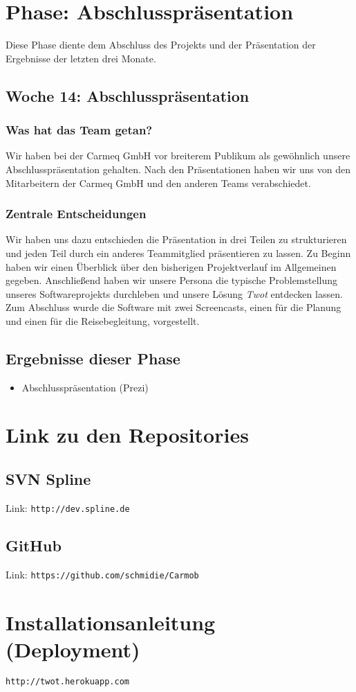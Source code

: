 \documentclass{article}
\begin{document}
\section{Phase: Abschlusspr\"asentation}

Diese Phase diente dem Abschluss des Projekts und der Pr\"asentation der Ergebnisse der letzten drei Monate.

\subsection{Woche 14: Abschlusspr\"asentation}

\subsubsection{Was hat das Team getan?}

Wir haben bei der Carmeq GmbH vor breiterem Publikum als gew\"ohnlich unsere Abschlusspr\"asentation gehalten. Nach den Pr\"asentationen haben wir uns von den Mitarbeitern der Carmeq GmbH und den anderen Teams verabschiedet.

\subsubsection{Zentrale Entscheidungen}

Wir haben uns dazu entschieden die Pr\"asentation in drei Teilen zu strukturieren und jeden Teil durch ein anderes Teammitglied pr\"asentieren zu lassen. Zu Beginn haben wir einen \"Uberblick \"uber den bisherigen Projektverlauf im Allgemeinen gegeben. Anschlie\ss end haben wir unsere Persona die typische Problemstellung unseres Softwareprojekts durchleben und unsere L\"osung \textit{Twot} entdecken lassen. Zum Abschluss wurde die Software mit zwei Screencasts, einen f\"ur die Planung und einen f\"ur die Reisebegleitung, vorgestellt.

\subsection{Ergebnisse dieser Phase}

\begin{itemize}
\item Abschlusspr\"asentation (Prezi)
\end{itemize}

\section{Link zu den Repositories}

\subsection{SVN Spline}

Link: \texttt{http://dev.spline.de}

\subsection{GitHub}

Link: \texttt{https://github.com/schmidie/Carmob}

\section{Installationsanleitung (Deployment)}

\texttt{http://twot.herokuapp.com}
\end{document}
